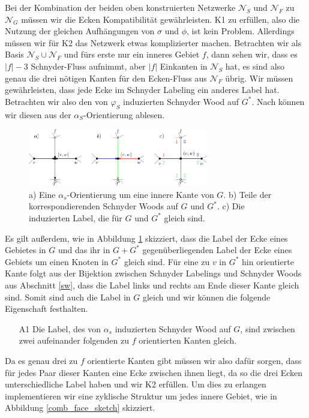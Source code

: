 Bei der Kombination der beiden oben konstruierten Netzwerke $\mathcal{N}_S$ und $\mathcal{N}_F$ zu $\mathcal{N}_G$ müssen wir die Ecken Kompatibilität gewährleisten. K1 zu erfüllen, also die Nutzung der gleichen Aufhängungen von $\sigma$ und $\phi$, ist kein Problem. Allerdings müssen wir für K2 das Netzwerk etwas komplizierter machen. Betrachten wir als Basis $\mathcal{N}_S \cup \mathcal{N}_F$ und fürs erste nur ein inneres Gebiet $f$, dann sehen wir, dass es $|f|-3$ Schnyder-Fluss aufnimmt, aber $|f|$ Einkanten in $\mathcal{N}_S$ hat, es sind also genau die drei nötigen Kanten für den Ecken-Fluss aus $\mathcal{N}_F$ übrig. Wir müssen gewährleisten, dass jede Ecke im Schnyder Labeling ein anderes Label hat. Betrachten wir also den von $\varphi_S$ induzierten Schnyder Wood auf $G^*$. Nach \cite{felsner12} können wir diesen aus der $\alpha_S$-Orientierung ablesen. 

\begin{figure}[h]
	\centering
  	\includegraphics[width=0.7\textwidth]{alpha_bij.png}
  	\caption{a) Eine $\alpha_s$-Orientierung um eine innere Kante von $G$. b) Teile der korrespondierenden Schnyder Woods auf $G$ und $G^*$. c) Die induzierten Label, die für $G$ und $G^*$ gleich sind.}
	\label{alpha_bij}
\end{figure}

Es gilt außerdem, wie in Abbildung \ref{alpha_bij} skizziert, dass die Label der Ecke eines Gebietes in $G$ und das ihr in $G+G^*$ gegenüberliegenden Label der Ecke eines Gebiets um einen Knoten in $G^*$ gleich sind. Für eine zu $v$ in $G^*$ hin orientierte Kante folgt aus der Bijektion zwischen Schnyder Labelings und Schnyder Woods aus Abschnitt \ref{sw}, dass die Label links und rechts am Ende dieser Kante gleich sind. Somit sind auch die Label in $G$ gleich und wir können die folgende Eigenschaft festhalten.
\begin{itemize}
\item [A1] Die Label, des von $\alpha_s$ induzierten Schnyder Wood auf $G$, sind zwischen zwei aufeinander folgenden zu $f$ orientierten Kanten gleich.
\end{itemize}
Da es genau drei zu $f$ orientierte Kanten gibt müssen wir also dafür sorgen, dass für jedes Paar dieser Kanten eine Ecke zwischen ihnen liegt, da so die drei Ecken unterschiedliche Label haben und wir K2 erfüllen. Um dies zu erlangen implementieren wir eine zyklische Struktur um jedes innere Gebiet, wie in Abbildung \ref{comb_face_sketch} skizziert.\\

